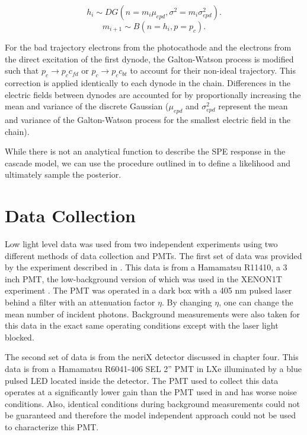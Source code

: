 \begin{equation}
\label{gw_1}
h_{i} \sim DG(n=m_{i} \mu_{epd}, \sigma^2 = m_{i} \sigma^2_{epd}).
\end{equation}
\begin{equation}
\label{gw_2}
m_{i+1} \sim B(n=h_{i}, p=p_{c}).
\end{equation}

For the bad trajectory electrons from the photocathode and the electrons from the direct excitation of the first dynode, the Galton-Watson process is modified such that $p_{c} \rightarrow p_{c} c_{fd}$ or $p_{c} \rightarrow p_{c} c_{bt}$ to account for their non-ideal trajectory.  This correction is applied identically to each dynode in the chain.  Differences in the electric fields between dynodes are accounted for by proportionally increasing the mean and variance of the discrete Gaussian ($\mu_{epd}$ and $\sigma^2_{epd}$ represent the mean and variance of the Galton-Watson process for the smallest electric field in the chain).

While there is not an analytical function to describe the SPE response in the cascade model, we can use the procedure outlined in  to define a likelihood and ultimately sample the posterior.


\section{Data Collection}


Low light level data was used from two independent experiments using two different methods of data collection and PMTs.  The first set of data was provided by the experiment described in .  This data is from a Hamamatsu R11410, a 3 inch PMT, the low-background version of which was used in the XENON1T experiment \cite{aprile2016physics}. The PMT was operated in a dark box with a 405 nm pulsed laser behind a filter with an attenuation factor $\eta$.  By changing $\eta$, one can change the mean number of incident photons.  Background measurements were also taken for this data in the exact same operating conditions except with the laser light blocked.

The second set of data is from the neriX detector discussed in chapter four.  This data is from a Hamamatsu R6041-406 SEL 2'' PMT in LXe illuminated by a blue pulsed LED located inside the detector.  The PMT used to collect this data operates at a significantly lower gain than the PMT used in  and has worse noise conditions.  Also, identical conditions during background measurements could not be guaranteed and therefore the model independent approach could not be used to characterize this PMT.

